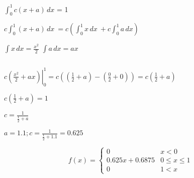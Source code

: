 \documentclass[a4paper]{article}
\begin{document}
 \(\int_{0}^{1} c(x+a) \,dx\) = 1
 

  \(c\int_{0}^{1} (x+a) \,dx\ = c(\int_{0}^{1} x \,dx\ + 
  c\int_{0}^{1} a \,dx)\)
  
  
  \(\int x \, dx = \frac{x^2}{2}\)
  \(\int a \, dx = ax\)
  
	\( \)
	
	
  \(\left. c(\frac{x^2}{2} + ax)\right\vert_{0}^{1} = 
  c((\frac{1}{2} + a) - (\frac{0}{2} + 0)) = c(\frac{1}{2} + a)\)
  
  \(c(\frac{1}{2} + a) = 1\)
  
  \( c = \frac{1}{\frac{1}{2} + a} \)
  
  \( a = 1.1; c = \frac{1}{\frac{1}{2} + 1.1} = 0.625 \)
    
  \[ f(x) = \begin{cases} 
      0 & x < 0 \\
      0.625 x + 0.6875 & 0\leq x\leq 1 \\
      0 & 1 < x 
   \end{cases}
\]
\end{document}
